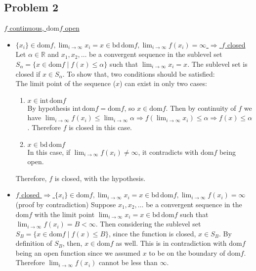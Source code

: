 \documentclass[12pt, letterpaper, twoside]{article}
\newcommand{\R}{\mathbb{R}}
\begin{document}
\subsection*{Problem 2}
\underline{$f$ continuous, $\mathrm{dom}f$ open}
\begin{itemize}[label={}]
    \item {\color{cyan}\fbox{$\Rightarrow$}} \underline{$\{x_i\}\in\mathrm{dom}f, \lim_{i\rightarrow\infty}x_i=x\in\mathrm{bd}\,\mathrm{dom}f, \lim_{i\rightarrow\infty}f(x_i)=\infty$  $\Rightarrow$ $f$ closed}\\

    Let $\alpha\in\R$ and $x_1, x_2, \dots$ be a convergent sequence in the sublevel set $S_{\alpha}=\{x\in\mathrm{dom}f\mid f(x)\leq\alpha\}$ such that $\lim_{i\rightarrow\infty} x_i=x$.
    The sublevel set is closed if $x\in S_{\alpha}$. To show that, two conditions should be satisfied:\\
    The limit point of the sequence ($x$) can exist in only two cases:
    \begin{enumerate}
        \item $x\in\mathrm{int}\,\mathrm{dom}f$\\
        By hypothesis $\mathrm{int}\,\mathrm{dom}f=\mathrm{dom}f$, so $x\in\mathrm{dom}f$. Then by continuity of $f$ we have $\lim_{i\rightarrow\infty}f(x_i)\leq\lim_{i\rightarrow\infty}\alpha\Rightarrow
         f(\lim_{i\rightarrow\infty} x_i)\leq\alpha\Rightarrow f(x)\leq\alpha$. Therefore $f$ is closed in this case.
        
        \item $x\in\mathrm{bd}\,\mathrm{dom}f$\\
        In this case, if $\lim_{i\rightarrow\infty}f(x_i)\neq\infty$, it contradicts with $\mathrm{dom}f$ being open.
    \end{enumerate}
    Therefore, $f$ is closed, with the hypothesis.

    \item {\color{cyan}\fbox{$\Leftarrow$}} \underline{$f$ closed $\Rightarrow$ $\{x_i\}\in\mathrm{dom}f, \lim_{i\rightarrow\infty}x_i=x\in\mathrm{bd}\,\mathrm{dom}f, \lim_{i\rightarrow\infty}f(x_i)=\infty$}\\
    
    (proof by contradiction) Suppose $x_1, x_2, \dots$ be a convergent sequence in the $\mathrm{dom}f$ with the limit point $\lim_{i\rightarrow\infty}x_i=x\in\mathrm{bd}\,\mathrm{dom}f$ such that $\lim_{i\rightarrow\infty} f(x_i)=B<\infty$.
    Then considering the sublevel set $S_B=\{x\in\mathrm{dom}f\mid f(x)\leq B\}$, since the function is closed, $x\in S_B$. By definition of $S_B$, then, $x\in\mathrm{dom}f$ as well. This is in contradiction with $\mathrm{dom}f$ being an open function since we assumed $x$ to be on the boundary of $\mathrm{dom}f$. Therefore $\lim_{i\rightarrow\infty} f(x_i)$ cannot be less than $\infty$. 
    
\end{itemize}
\clearpage
\end{document}
